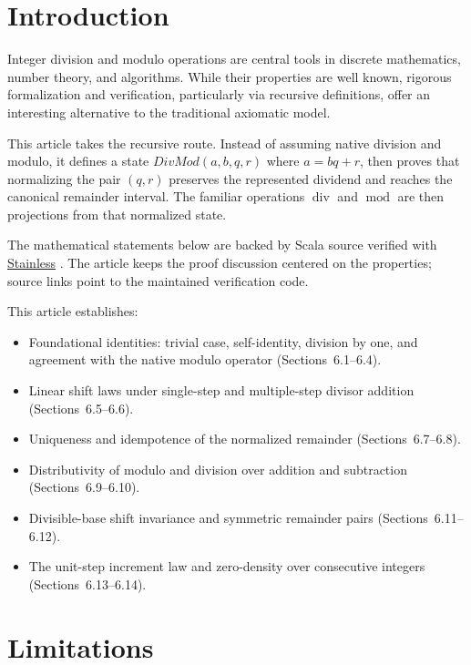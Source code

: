 \section{Introduction}
\label{sec:introduction}

Integer division and modulo operations are central tools in discrete
mathematics, number theory, and algorithms. While their properties are well
known, rigorous formalization and verification, particularly via recursive
definitions, offer an interesting alternative to the traditional axiomatic
model.

This article takes the recursive route. Instead of assuming native division
and modulo, it defines a state $DivMod(a,b,q,r)$ where $a = bq + r$, then proves
that normalizing the pair $(q,r)$ preserves the represented dividend and
reaches the canonical remainder interval. The familiar operations
$\operatorname{div}$ and $\operatorname{mod}$ are then projections from that
normalized state.

The mathematical statements below are backed by Scala source verified with
\href{https://epfl-lara.github.io/stainless/intro.html}{Stainless}
\cite{hamza2019systemfr}. The article
keeps the proof discussion centered on the properties; source links point to
the maintained verification code.

This article establishes:

\begin{itemize}
  \item Foundational identities: trivial case, self-identity, division by one,
    and agreement with the native modulo operator (Sections~6.1--6.4).
  \item Linear shift laws under single-step and multiple-step divisor addition
    (Sections~6.5--6.6).
  \item Uniqueness and idempotence of the normalized remainder
    (Sections~6.7--6.8).
  \item Distributivity of modulo and division over addition and subtraction
    (Sections~6.9--6.10).
  \item Divisible-base shift invariance and symmetric remainder pairs
    (Sections~6.11--6.12).
  \item The unit-step increment law and zero-density over consecutive integers
    (Sections~6.13--6.14).
\end{itemize}

\section{Limitations}
\label{sec:limitations}

